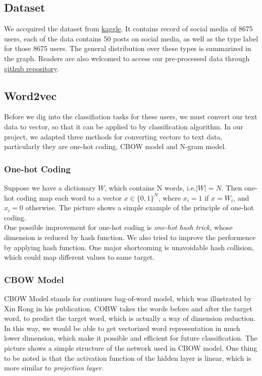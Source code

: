 \documentclass{article}
\begin{document}
\subsection{Dataset}
We accquired the dataset from \href{https://www.kaggle.com/datasnaek/mbti-type}{kaggle}. It contains record of social media of 8675 users, each of the data contains 50 posts on social media, as well as the type label for those 8675 users. The general distribution over these types is summarized in the graph. Readers are also welcomed to access our pre-processed data through \href{https://github.com/Martin4115/SI151_Project}{github repository}.

\subsection{Word2vec}
Before we dig into the classifiation tasks for these users, we must convert our text data to vector, so that it can be applied to by classification algorithm. In our project, we adapted three methods for converting vectors to text data, particularly they are one-hot coding, CBOW model and N-gram model.

\subsubsection{One-hot Coding}
Suppose we have a dictionary $W$, which contains N words, i.e.$|W|=N$. Then one-hot coding map each word to a vector $x \in \{0,1\}^N$, where $x_i=1$ if $x=W_i$, and $x_i=0$ otherwise. The picture shows a simple example of the principle of one-hot coding.\\
One possible improvement for one-hot coding is \emph{one-hot hash trick}, whose dimension is reduced by hash function. We also tried to improve the performence by applying hash function. One major shortcoming is unavoidable hash collision, which could map different values to same target.

\subsubsection{CBOW Model}
CBOW Model stands for continues bag-of-word model, which was illustrated by Xin Rong in his publication. COBW takes the words before and after the target word, to predict the target word, which is actually a way of dimension reduction. In this way, we would be able to get vectorized word representation in much lower dimension, which make it possible and efficient for future classification. The picture shows a simple structure of the network used in CBOW model. One thing to be noted is that the activation function of the hidden layer is linear, which is more similar to \emph{projection layer}.
\end{document}
